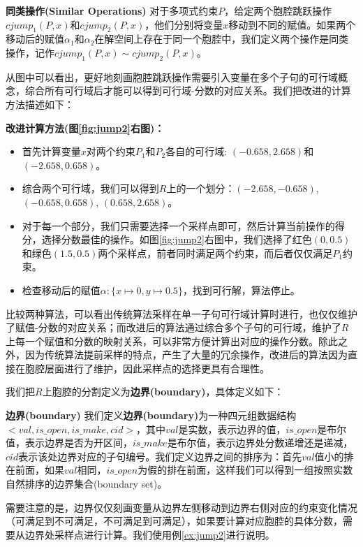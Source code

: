 \begin{example}
\begin{definition}{\textbf{同类操作(Similar Operations)}}
    对于多项式约束$P$，给定两个胞腔跳跃操作$cjump_1(P, x)$和$cjump_2(P, x)$，他们分别将变量$x$移动到不同的赋值。如果两个移动后的赋值$\alpha_1$和$\alpha_2$在解空间上存在于同一个胞腔中，我们定义两个操作是同类操作，记作$cjump_1(P, x) \sim cjump_2(P, x)$。
\end{definition}
从图中可以看出，更好地刻画胞腔跳跃操作需要引入变量在多个子句的可行域概念，综合所有可行域后才能可以得到可行域-分数的对应关系。我们把改进的计算方法描述如下：

\textbf{改进计算方法(图\ref{fig:jump2}右图)：}
\begin{itemize}
    \item 首先计算变量$x$对两个约束$P_1$和$P_2$各自的可行域: $(-0.658, 2.658)$和$(-2.658, 0.658)$。
    \item 综合两个可行域，我们可以得到$R$上的一个划分：$(-2.658, -0.658)$, $(-0.658, 0.658)$, $(0.658, 2.658)$。
    \item 对于每一个部分，我们只需要选择一个采样点即可，然后计算当前操作的得分，选择分数最佳的操作。如图\ref{fig:jump2}右图中，我们选择了红色$(0, 0.5)$和绿色$(1.5, 0.5)$两个采样点，前者同时满足两个约束，而后者仅仅满足$P_1$约束。
    \item 检查移动后的赋值$\alpha: \{x \mapsto 0, y \mapsto 0.5\}$，找到可行解，算法停止。
\end{itemize}
比较两种算法，可以看出传统算法采样在单一子句可行域计算时进行，也仅仅维护了赋值-分数的对应关系；而改进后的算法通过综合多个子句的可行域，维护了$R$上每一个赋值和分数的映射关系，可以非常方便计算出对应的操作分数。除此之外，因为传统算法提前采样的特点，产生了大量的冗余操作，改进后的算法因为直接在胞腔层面进行了维护，因此采样点的选择更具有合理性。
\end{example}

我们把$R$上胞腔的分割定义为\textbf{边界(boundary)}，具体定义如下：
\begin{definition}{\textbf{边界(boundary)}}
我们定义\textbf{边界(boundary)}为一种四元组数据结构$<val, is\_open, is\_make, cid>$，其中$val$是实数，表示边界的值，$is\_open$是布尔值，表示边界是否为开区间，$is\_make$是布尔值，表示边界处分数递增还是递减，$cid$表示该处边界对应的子句编号。我们定义边界之间的排序为：首先$val$值小的排在前面，如果$val$相同，$is\_open$为假的排在前面，这样我们可以得到一组按照实数自然排序的边界集合(boundary set)。
\end{definition}
需要注意的是，边界仅仅刻画变量从边界左侧移动到边界右侧对应的约束变化情况（可满足到不可满足，不可满足到可满足），如果要计算对应胞腔的具体分数，需要从边界处采样点进行计算。我们使用例\ref{ex:jump2}进行说明。

